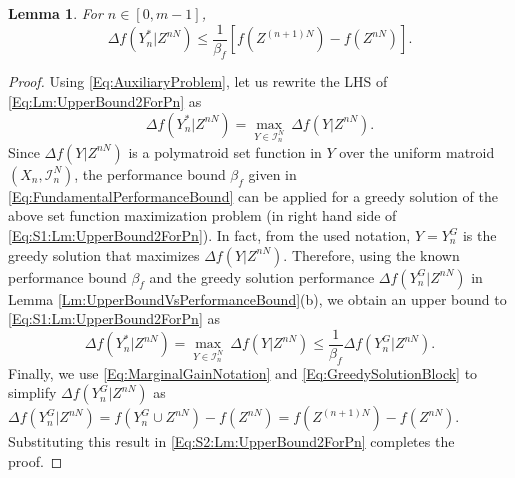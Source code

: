 \documentclass[conference]{IEEEtran}
\newtheorem{lemma}{Lemma}
\begin{document}

\begin{lemma} \label{Lm:UpperBound2ForPn}
For $n\in [0,m-1]$,
\begin{equation} \label{Eq:Lm:UpperBound2ForPn}
\Delta f(Y^*_n\vert Z^{nN}) \leq  \frac{1}{\beta_f}\left[ f(Z^{(n+1)N})-f(Z^{nN})\right].      
\end{equation}
\end{lemma}

\begin{proof}
Using \eqref{Eq:AuxiliaryProblem}, let us rewrite the LHS of \eqref{Eq:Lm:UpperBound2ForPn} as
\begin{equation}\label{Eq:S1:Lm:UpperBound2ForPn}
    \Delta f(Y^*_n\vert Z^{nN}) = \underset{Y\in\mathcal{I}^N_n}{\max}\ \Delta f(Y\vert Z^{nN}).
\end{equation}
Since $\Delta f(Y\vert Z^{nN})$ is a polymatroid set function in $Y$ over the uniform matroid $(X_n,\mathcal{I}^N_n)$, the performance bound $\beta_f$ given in \eqref{Eq:FundamentalPerformanceBound} can be applied for a greedy solution of the above set function maximization problem (in right hand side of \eqref{Eq:S1:Lm:UpperBound2ForPn}). In fact, from the used notation, $Y=Y^G_n$ is the greedy solution that maximizes $\Delta f(Y\vert Z^{nN})$. Therefore, using the known performance bound $\beta_f$ and the greedy solution performance $\Delta f(Y^G_n\vert Z^{nN})$ in Lemma \ref{Lm:UpperBoundVsPerformanceBound}(b), we obtain an upper bound to \eqref{Eq:S1:Lm:UpperBound2ForPn} as 
\begin{equation}\label{Eq:S2:Lm:UpperBound2ForPn}
    \Delta f(Y^*_n\vert Z^{nN}) = \underset{Y\in\mathcal{I}^N_n}{\max}\ \Delta f(Y\vert Z^{nN}) \leq \frac{1}{\beta_f} \Delta f(Y^G_n\vert Z^{nN}).
\end{equation}
Finally, we use \eqref{Eq:MarginalGainNotation} and \eqref{Eq:GreedySolutionBlock} to simplify $\Delta f(Y^G_n\vert Z^{nN})$ as $\Delta f(Y^G_n\vert Z^{nN}) = f(Y^G_n\cup Z^{nN})-f(Z^{nN}) = f(Z^{(n+1)N})-f(Z^{nN})$. Substituting this result in \eqref{Eq:S2:Lm:UpperBound2ForPn} completes the proof. \end{proof}
\end{document}
